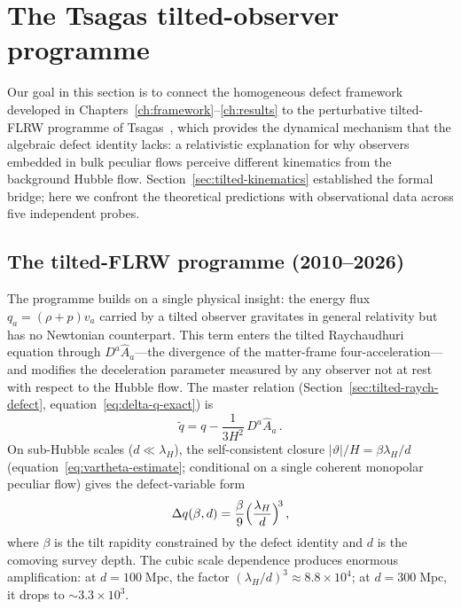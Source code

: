 \section{The Tsagas tilted-observer programme}
\label{sec:disc-tsagas}

Our goal in this section is to connect the homogeneous defect
framework developed in Chapters~\ref{ch:framework}--\ref{ch:results}
to the perturbative tilted-FLRW programme of
Tsagas~\cite{Tsagas2010,TsagasKadiltzoglou2013,Tsagas2021_Jeans},
which provides the dynamical mechanism that the algebraic defect
identity lacks: a relativistic explanation for why observers
embedded in bulk peculiar flows perceive different kinematics from
the background Hubble flow.  Section~\ref{sec:tilted-kinematics}
established the formal bridge; here we confront the theoretical
predictions with observational data across five independent probes.


\subsection{The tilted-FLRW programme (2010--2026)}
\label{sec:disc-tsagas-programme}

The programme builds on a single physical insight: the energy flux
$q_a = (\rho + p)v_a$ carried by a tilted observer gravitates in
general relativity but has no Newtonian counterpart.  This term
enters the tilted Raychaudhuri equation through
$D^a\hat{A}_a$---the divergence of the matter-frame
four-acceleration---and modifies the deceleration parameter
measured by any observer not at rest with respect to the Hubble flow.
The master relation (Section~\ref{sec:tilted-raych-defect},
equation~\eqref{eq:delta-q-exact}) is
\begin{equation}\label{eq:disc-qtilde}
\tilde{q}
= q - \frac{1}{3H^2}\,D^a\hat{A}_a\,.
\end{equation}
On sub-Hubble scales ($d \ll \lambda_H$), the self-consistent
closure $|\vartheta|/H = \beta\lambda_H/d$
(equation~\eqref{eq:vartheta-estimate}; conditional on a single
coherent monopolar peculiar flow) gives the defect-variable
form
\begin{equation}\label{eq:disc-Dq}
\Delta q(\beta, d)
= \frac{\beta}{9}
  \Bigl(\frac{\lambda_H}{d}\Bigr)^{\!3}\,,
\end{equation}
where $\beta$ is the tilt rapidity constrained by the defect
identity and $d$ is the comoving survey depth.  The cubic scale
dependence produces enormous amplification: at
$d = 100\;\mathrm{Mpc}$, the factor
$(\lambda_H/d)^3 \approx 8.8 \times 10^4$; at
$d = 300\;\mathrm{Mpc}$, it drops to
$\sim 3.3 \times 10^3$.

